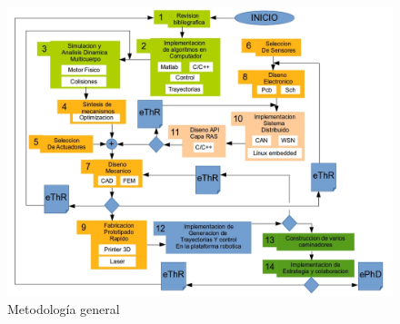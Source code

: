 \begin{figure}[!htb]
  \centering
  \includegraphics[scale=0.42]{../images/metGen2.png}
  \caption{Metodolog\'ia general}
  \label{fig:method}
\end{figure}

